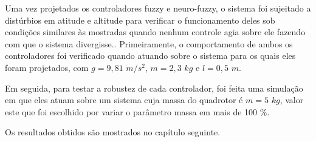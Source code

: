 Uma vez projetados os controladores fuzzy e neuro-fuzzy, o sistema foi sujeitado a distúrbios em atitude e altitude para verificar o funcionamento deles sob condições similares às mostradas quando nenhum controle agia sobre ele fazendo com que o sistema divergisse.. Primeiramente, o comportamento de ambos os controladores foi verificado quando atuando sobre o sistema para os quais eles foram projetados, com $g=9,81$ $m/s^2$, $m=2,3$ $kg$ e $l=0,5$ $m$. 

Em seguida, para testar a robustez de cada controlador, foi feita uma simulação em que eles atuam sobre um sistema cuja massa do quadrotor é $m=5$ $kg$, valor este que foi escolhido por variar o parâmetro massa em mais de 100 \%.

Os resultados obtidos são mostrados no capítulo seguinte.
